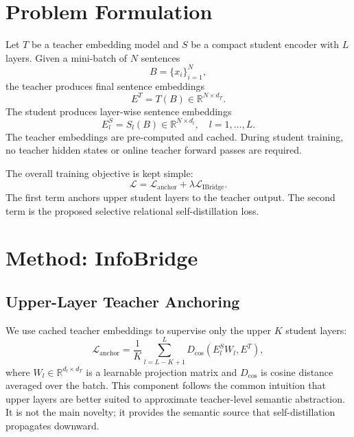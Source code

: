 \documentclass[letterpaper]{article}
\begin{document}
\section{Problem Formulation}

Let $T$ be a teacher embedding model and $S$ be a compact student encoder with $L$ layers. Given a mini-batch of $N$ sentences
\begin{equation}
    B=\{x_i\}_{i=1}^{N},
\end{equation}
the teacher produces final sentence embeddings
\begin{equation}
    E^T = T(B) \in \mathbb{R}^{N\times d_T}.
\end{equation}
The student produces layer-wise sentence embeddings
\begin{equation}
    E_l^S = S_l(B) \in \mathbb{R}^{N\times d_l},\quad l=1,\ldots,L.
\end{equation}
The teacher embeddings are pre-computed and cached. During student training, no teacher hidden states or online teacher forward passes are required.

The overall training objective is kept simple:
\begin{equation}
    \mathcal{L}=\mathcal{L}_{\mathrm{anchor}}+\lambda\mathcal{L}_{\mathrm{IBridge}}.
\end{equation}
The first term anchors upper student layers to the teacher output. The second term is the proposed selective relational self-distillation loss.

\section{Method: InfoBridge}

\subsection{Upper-Layer Teacher Anchoring}

We use cached teacher embeddings to supervise only the upper $K$ student layers:
\begin{equation}
    \mathcal{L}_{\mathrm{anchor}}
    =
    \frac{1}{K}
    \sum_{l=L-K+1}^{L}
    D_{\cos}(E_l^S W_l,E^T),
\end{equation}
where $W_l\in\mathbb{R}^{d_l\times d_T}$ is a learnable projection matrix and $D_{\cos}$ is cosine distance averaged over the batch. This component follows the common intuition that upper layers are better suited to approximate teacher-level semantic abstraction. It is not the main novelty; it provides the semantic source that self-distillation propagates downward.
\end{document}
